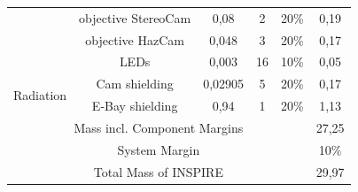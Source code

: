 \begin{table}[hbt]
{\begin{tabular}{@{}cccccc@{}}
                                        & objective StereoCam                 & 0,08                        & 2        & 20\%             & 0,19           \\
                                        & objective HazCam                    & 0,048                       & 3        & 20\%             & 0,17           \\
                                        & LEDs                                & 0,003                       & 16       & 10\%             & 0,05           \\ \midrule
\multirow{2}{*}{Radiation}              & Cam shielding                       & 0,02905                     & 5        & 20\%             & 0,17           \\
                                        & E-Bay shielding                     & 0,94                        & 1        & 20\%             & 1,13           \\ \midrule
\multicolumn{5}{c}{Mass incl. Component Margins}                                                                                          & 27,25          \\
\multicolumn{5}{c}{System Margin}                                                                                                         & 10\%         \\
\multicolumn{5}{c}{Total Mass of INSPIRE}                                                                                                 & 29,97        \\\bottomrule
\end{tabular}%
}
\label{tab:totalMass}
\end{table}

\clearpage

